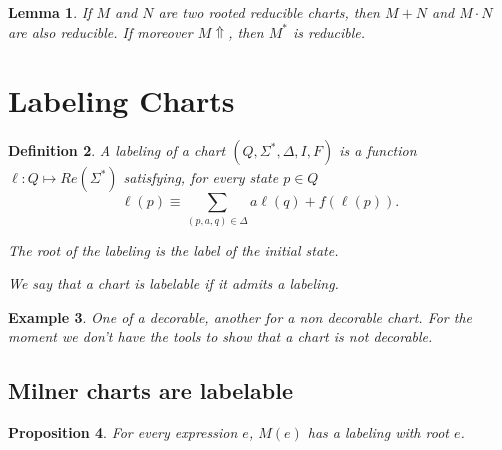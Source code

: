 \documentclass{article}
\newtheorem{definition}{Definition}[section]
\newtheorem{lemma}[definition]{Lemma}
\newtheorem{proposition}[definition]{Proposition}
\newtheorem{example}[definition]{Example}
\begin{document}

\begin{lemma}
  If $M$ and $N$ are two rooted reducible charts, then $M+N$ and $M \cdot N$ are also reducible. 
  If moreover $M \Uparrow$, then $M^*$ is reducible.  
\end{lemma}

\section{Labeling Charts}

\begin{definition}
A \emph{labeling} of a chart $(Q, \Sigma^*, \Delta, I, F)$ is a function 
$\ell:Q \mapsto Re(\Sigma^*)$ satisfying, for every state $p\in Q$
$$\ell(p)\equiv\underset{(p,a, q) \in \Delta}{\sum} a \ell(q) + f(\ell(p)).$$

The \emph{root} of the labeling is the label of the initial state.

 We say that a chart  is \emph{labelable} if it admits a labeling.
\end{definition}



\begin{example}
    One of a decorable, another for a non decorable chart. For the moment we don't have the tools to show that a chart is not decorable.
\end{example}


\subsection{Milner charts are labelable}

\begin{proposition} For every expression $e$, $M(e)$ has a labeling with root $e$.~\label{prop:milner-chart-is-decorable}
~\label{prop:Milner-is-decorable}\end{proposition}
\end{document}
